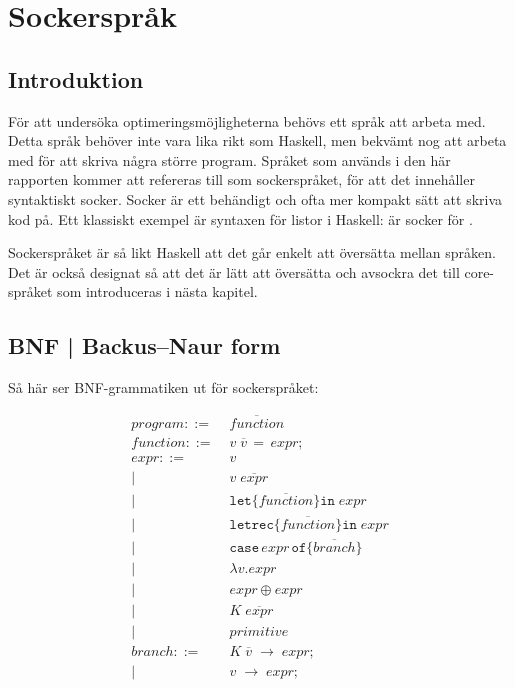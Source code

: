 \documentclass[Rapport]{subfiles}
\begin{document}
\section{Sockerspråk}

%
%
%
%
%
%
%

%

\subsection{Introduktion}

För att undersöka optimeringsmöjligheterna behövs ett språk att arbeta med. 
Detta språk behöver inte vara lika rikt som Haskell, men bekvämt nog
att arbeta med för att skriva några större program. Språket som används i den
här rapporten kommer att refereras till som sockerspråket, för att det 
innehåller syntaktiskt socker. Socker är ett behändigt och ofta mer kompakt sätt 
att skriva kod på. Ett klassiskt exempel är syntaxen
för listor i Haskell: \miniCode{[5,0,4]} är socker för .

Sockerspråket är så likt Haskell att det går enkelt att översätta mellan språken.
Det är också designat så att det är lätt att översätta och avsockra det till 
core-språket som introduceras i nästa kapitel. 

\subsection{BNF | Backus–Naur form}

Så här ser BNF-grammatiken ut för sockerspråket:


\begin{equation*}
\begin{aligned}
program ::=&\; \overline{function} \\ 
function ::=&\; v \; \overline{v} \, \mathtt{=} \, expr \mathtt{;} \\
expr ::=&\;  v \\
       |&\; v \; \overline{expr}  \\ 
       |&\; \mathtt{let \{} \overline{function} \mathtt{\} in }\; expr \\
       |&\; \mathtt{letrec \{} \overline{function} \mathtt{\} in} \; expr \\
       |&\; \mathtt{case}\,expr\,\mathtt{of \{} \overline{branch} \mathtt{\}} \\
       |&\; \mathtt{\lambda } v \mathtt{.} expr \\
       |&\; expr \oplus expr \\ 
       |&\; K \; \overline{expr} \\
       |&\; primitive \\
branch ::=&\; K \; \overline{v} \; \mathtt{\rightarrow} \; expr \mathtt{;} \\
         |&\; v \; \mathtt{\rightarrow} \; expr \mathtt{;}
\end{aligned}
\end{equation*}
\end{document}
